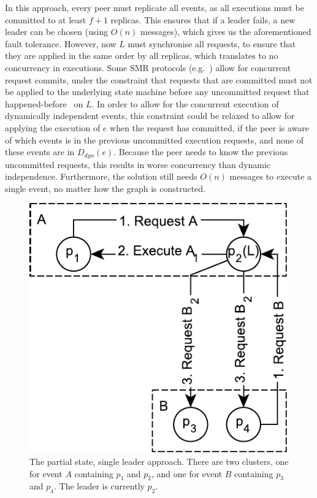 \documentclass{article}
\begin{document}
	In this approach, every peer must replicate all events, as all executions must be committed to at least $f+1$ replicas.
	This ensures that if a leader fails, a new leader can be chosen (using $O(n)$ messages), which gives us the aforementioned fault tolerance.
	However, now $L$ must synchronise all requests, to ensure that they are applied in the same order by all replicas, which translates to no concurrency in executions.
	Some SMR protocols (e.g.~\cite{castro_practical_1999}) allow for concurrent request commits, under the constraint that requests that are committed must not be applied to the underlying state machine before any uncommitted request that happened-before~\cite{lamport_time_1978} on $L$.
	In order to allow for the concurrent execution of dynamically independent events, this constraint could be relaxed to allow for applying the execution of $e$ when the request has committed, if the peer is aware of which events is in the previous uncommitted execution requests, and none of these events are in $D_{dyn}(e)$.
	Because the peer needs to know the previous uncommitted requests, this results in worse concurrency than dynamic independence.
	Furthermore, the solution still needs $O(n)$ messages to execute a single event, no matter how the graph is constructed.

    \begin{figure}[ht]
        \center
        \includegraphics[scale=0.7]{figures/dcr-graphs/partial-state-single-leader-approach.pdf}
        \caption{The partial state, single leader approach.
        There are two clusters, one for event $A$ containing $p_1$ and $p_2$, and one for event $B$ containing $p_3$ and $p_4$.
        The leader is currently $p_2$.}
        \label{fig:partial-state-single-leader-approach}
    \end{figure}
    \FloatBarrier
\end{document}

